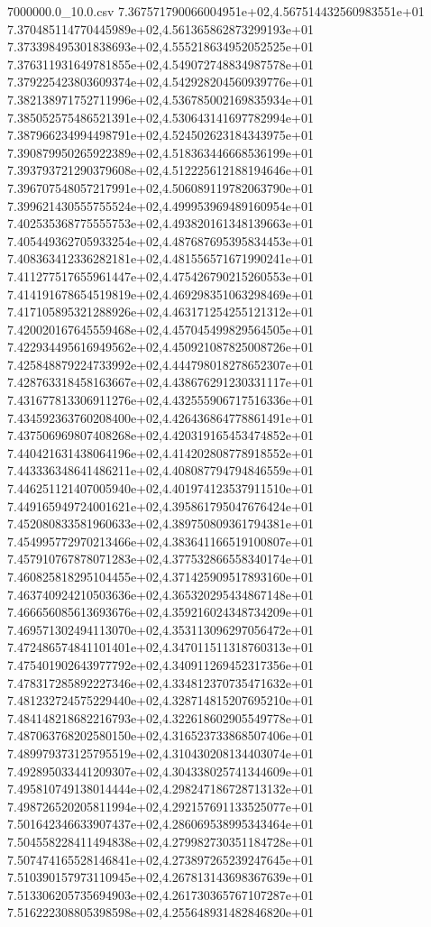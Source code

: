\begin{filecontents*}{7000000.0_10.0.csv}
7.367571790066004951e+02,4.567514432560983551e+01
7.370485114770445989e+02,4.561365862873299193e+01
7.373398495301838693e+02,4.555218634952052525e+01
7.376311931649781855e+02,4.549072748834987578e+01
7.379225423803609374e+02,4.542928204560939776e+01
7.382138971752711996e+02,4.536785002169835934e+01
7.385052575486521391e+02,4.530643141697782994e+01
7.387966234994498791e+02,4.524502623184343975e+01
7.390879950265922389e+02,4.518363446668536199e+01
7.393793721290379608e+02,4.512225612188194646e+01
7.396707548057217991e+02,4.506089119782063790e+01
7.399621430555755524e+02,4.499953969489160954e+01
7.402535368775555753e+02,4.493820161348139663e+01
7.405449362705933254e+02,4.487687695395834453e+01
7.408363412336282181e+02,4.481556571671990241e+01
7.411277517655961447e+02,4.475426790215260553e+01
7.414191678654519819e+02,4.469298351063298469e+01
7.417105895321288926e+02,4.463171254255121312e+01
7.420020167645559468e+02,4.457045499829564505e+01
7.422934495616949562e+02,4.450921087825008726e+01
7.425848879224733992e+02,4.444798018278652307e+01
7.428763318458163667e+02,4.438676291230331117e+01
7.431677813306911276e+02,4.432555906717516336e+01
7.434592363760208400e+02,4.426436864778861491e+01
7.437506969807408268e+02,4.420319165453474852e+01
7.440421631438064196e+02,4.414202808778918552e+01
7.443336348641486211e+02,4.408087794794846559e+01
7.446251121407005940e+02,4.401974123537911510e+01
7.449165949724001621e+02,4.395861795047676424e+01
7.452080833581960633e+02,4.389750809361794381e+01
7.454995772970213466e+02,4.383641166519100807e+01
7.457910767878071283e+02,4.377532866558340174e+01
7.460825818295104455e+02,4.371425909517893160e+01
7.463740924210503636e+02,4.365320295434867148e+01
7.466656085613693676e+02,4.359216024348734209e+01
7.469571302494113070e+02,4.353113096297056472e+01
7.472486574841101401e+02,4.347011511318760313e+01
7.475401902643977792e+02,4.340911269452317356e+01
7.478317285892227346e+02,4.334812370735471632e+01
7.481232724575229440e+02,4.328714815207695210e+01
7.484148218682216793e+02,4.322618602905549778e+01
7.487063768202580150e+02,4.316523733868507406e+01
7.489979373125795519e+02,4.310430208134403074e+01
7.492895033441209307e+02,4.304338025741344609e+01
7.495810749138014444e+02,4.298247186728713132e+01
7.498726520205811994e+02,4.292157691133525077e+01
7.501642346633907437e+02,4.286069538995343464e+01
7.504558228411494838e+02,4.279982730351184728e+01
7.507474165528146841e+02,4.273897265239247645e+01
7.510390157973110945e+02,4.267813143698367639e+01
7.513306205735694903e+02,4.261730365767107287e+01
7.516222308805398598e+02,4.255648931482846820e+01

\end{filecontents*}

